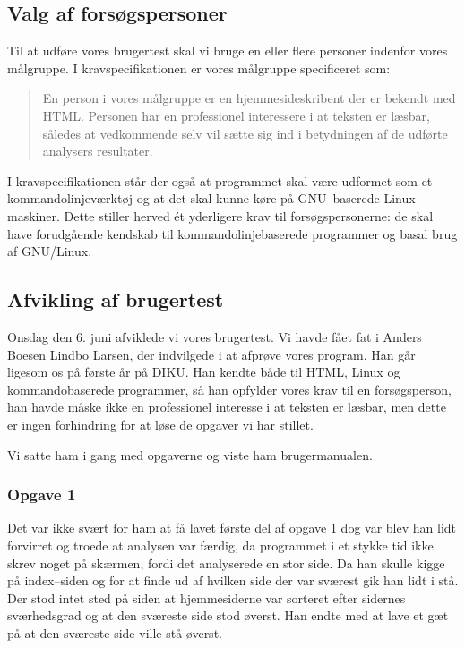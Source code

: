 \documentclass[a4paper,oneside]{memoir}
\begin{document}
\subsection{Valg af forsøgspersoner}
Til at udføre vores brugertest skal vi bruge en eller flere personer
indenfor vores målgruppe. I kravspecifikationen er vores målgruppe
specificeret som:
\begin{quote}
En person i vores målgruppe er en hjemmesideskribent der er bekendt
med HTML. Personen har en professionel interessere i at teksten er
læsbar, således at vedkommende selv vil sætte sig ind i betydningen af
de udførte analysers resultater.
\end{quote}

I kravspecifikationen står der også at programmet skal være udformet
som et kommandolinjeværktøj og at det skal kunne køre på GNU--baserede
Linux maskiner. Dette stiller herved ét yderligere krav til
forsøgspersonerne: de skal have forudgående kendskab til
kommando\-linje\-baserede programmer og basal brug af GNU/Linux.

\subsection{Afvikling af brugertest}
Onsdag den 6. juni afviklede vi vores brugertest. Vi havde fået fat i
Anders Boesen Lindbo Larsen, der indvilgede i at afprøve vores
program. Han går ligesom os på første år på DIKU. Han kendte både til
HTML, Linux og kommandobaserede programmer, så han opfylder vores krav
til en forsøgsperson, han havde måske ikke en professionel interesse i
at teksten er læsbar, men dette er ingen forhindring for at løse de
opgaver vi har stillet.

Vi satte ham i gang med opgaverne og viste ham brugermanualen.

\subsubsection{Opgave 1}
Det var ikke svært for ham at få lavet første del af opgave 1 dog var
blev han lidt forvirret og troede at analysen var færdig, da
programmet i et stykke tid ikke skrev noget på skærmen, fordi det
analyserede en stor side. Da han skulle kigge på index--siden og for
at finde ud af hvilken side der var sværest gik han lidt i stå. Der
stod intet sted på siden at hjemmesiderne var sorteret efter sidernes
sværhedsgrad og at den sværeste side stod øverst. Han endte med at
lave et gæt på at den sværeste side ville stå øverst.
\end{document}

